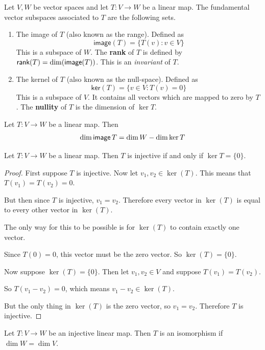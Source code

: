 \begin{defn} Let $V,W$ be vector spaces and let $T : V \to W$ be a linear map. The fundamental 
vector subspaces associated to $T$ are the following sets.
\begin{enumerate}
\item {
The image of $T$ (also known as the range). Defined as \[\textsf{image}(T) = \{T(v) : v \in V\}\]
This is a subspace of $W$. The \textbf{rank} of $T$ is defined by $\operatorname{\textsf{rank}}(T) = \dim(\operatorname{\textsf{image}}(T))$. This is an \textit{invariant} of $T$. 
}
\item {
The kernel of $T$ (also known as the null-space). Defined as \[\textsf{ker}(T) = \{v \in V : T(v)=0\}\]
This is a subspace of $V$. It contains all vectors which are mapped to zero by $T$. The \textbf{nullity} of $T$ is the dimension of $\ker T$.
}
\end{enumerate}
\end{defn}
\begin{thm}
Let $T : V \to W$ be a linear map. Then 
\begin{equation}\dim \operatorname{\textsf{image}} T = \dim W - \dim \ker T\end{equation}
\end{thm}
\begin{thm}
    Let $T : V \to W$ be a linear map. Then $T$ is injective if and only if $\ker T = \{0\}$.
\end{thm}
\begin{proof}
First suppose $T$ is injective. Now let $v_1,v_2 \in \ker(T)$. This means that $T(v_1)=T(v_2)=0$. 

But then since $T$ is injective, $v_1=v_2$. Therefore every vector in $\ker(T)$ is equal to every other vector in $\ker(T)$.

The only way for this to be possible is for $\ker(T)$ to contain exactly one vector. 

Since $T(0)=0$, this vector must be the zero vector. So $\ker(T) = \{0\}$.

Now suppose $\ker(T)=\{0\}$. Then let $v_1,v_2 \in V$ and suppose $T(v_1)=T(v_2)$. 

So $T(v_1-v_2)=0$, which means $v_1-v_2 \in \ker(T)$. 

But the only thing in $\ker(T)$ is the zero vector, so $v_1=v_2$. Therefore $T$ is injective.
\end{proof}
\begin{thm}
Let $T : V \to W$ be an injective linear map. Then $T$ is an isomorphism if $\dim W = \dim V$.
\end{thm}
